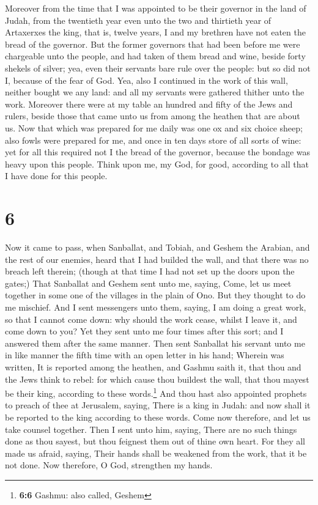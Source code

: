  Moreover from the time that I was appointed to be their
governor in the land of Judah, from the twentieth year even unto the two
and thirtieth year of Artaxerxes the king, that is, twelve years, I and
my brethren have not eaten the bread of the governor. 
But the former governors that had been before me were chargeable unto
the people, and had taken of them bread and wine, beside forty shekels
of silver; yea, even their servants bare rule over the people: but so
did not I, because of the fear of God.  Yea, also I
continued in the work of this wall, neither bought we any land: and all
my servants were gathered thither unto the work. 
Moreover there were at my table an hundred and fifty of the Jews and
rulers, beside those that came unto us from among the heathen that are
about us.  Now that which was prepared for me daily was
one ox and six choice sheep; also fowls were prepared for me, and once
in ten days store of all sorts of wine: yet for all this required not I
the bread of the governor, because the bondage was heavy upon this
people.  Think upon me, my God, for good, according to
all that I have done for this people.

\hypertarget{section-5}{%
\section{6}\label{section-5}}

 Now it came to pass, when Sanballat, and Tobiah, and
Geshem the Arabian, and the rest of our enemies, heard that I had
builded the wall, and that there was no breach left therein; (though at
that time I had not set up the doors upon the gates;) 
That Sanballat and Geshem sent unto me, saying, Come, let us meet
together in some one of the villages in the plain of Ono. But they
thought to do me mischief.  And I sent messengers unto
them, saying, I am doing a great work, so that I cannot come down: why
should the work cease, whilst I leave it, and come down to you?
 Yet they sent unto me four times after this sort; and I
answered them after the same manner.  Then sent Sanballat
his servant unto me in like manner the fifth time with an open letter in
his hand;  Wherein was written, It is reported among the
heathen, and Gashmu saith it, that thou and the Jews think to rebel: for
which cause thou buildest the wall, that thou mayest be their king,
according to these words.\footnote{\textbf{6:6} Gashmu: also called,
  Geshem}  And thou hast also appointed prophets to preach
of thee at Jerusalem, saying, There is a king in Judah: and now shall it
be reported to the king according to these words. Come now therefore,
and let us take counsel together.  Then I sent unto him,
saying, There are no such things done as thou sayest, but thou feignest
them out of thine own heart.  For they all made us afraid,
saying, Their hands shall be weakened from the work, that it be not
done. Now therefore, O God, strengthen my hands.

